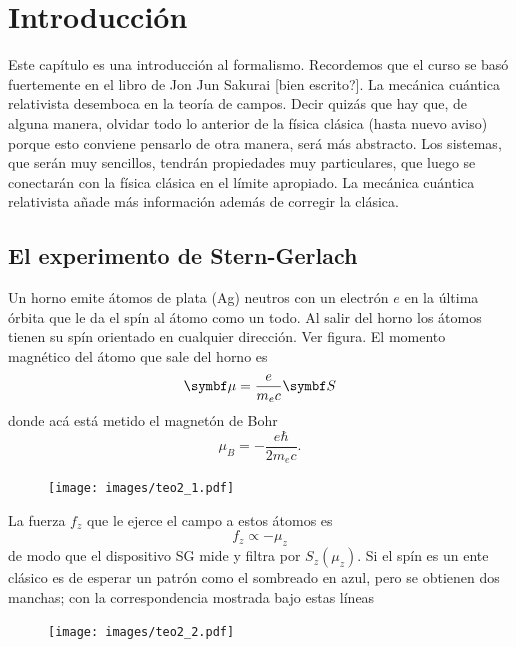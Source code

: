 \documentclass[10pt,oneside]{CBFT_book}
\begin{document}
\chapter{Introducción}

Este capítulo es una introducción al formalismo.
Recordemos que el curso se basó fuertemente en el libro de Jon Jun Sakurai [bien escrito?].
La mecánica cuántica relativista desemboca en la teoría de campos.
Decir quizás que hay que, de alguna manera, olvidar todo lo anterior de la física clásica (hasta
nuevo aviso) porque esto conviene pensarlo de otra manera, será más abstracto.
Los sistemas, que serán muy sencillos, tendrán propiedades muy particulares, que luego se
conectarán con la física clásica en el límite apropiado.
La mecánica cuántica relativista añade más información además de corregir la clásica.

\section{El experimento de Stern-Gerlach}

Un horno emite átomos de plata (Ag) neutros con un electrón $e$ en la última órbita que le da el spín
al átomo como un todo. Al salir del horno los átomos tienen su spín orientado en cualquier dirección.
Ver figura.
El momento magnético del átomo que sale del horno es 
\[
	\vb{\mu} = \frac{e}{m_e c} \vb{S}
\]
donde acá está metido el magnetón de Bohr 
\[
	\mu_B = -\frac{ e \hbar }{2 m_e c}.
\]

\begin{figure}[htb]
	\begin{center}
	\texttt{[image: images/teo2\_1.pdf]}	 
	\end{center}
	\caption{}
\end{figure} 

La fuerza $f_z$ que le ejerce el campo  a estos átomos es 
\[
	f_z \propto - \mu_z
\]
de modo que el dispositivo SG mide y filtra por $S_z(\mu_z)$. Si el spín es un ente clásico
es de esperar un patrón como el sombreado en azul, pero se obtienen dos manchas; 
con la correspondencia mostrada bajo estas líneas
\begin{figure}[htb]
	\begin{center}
	\texttt{[image: images/teo2\_2.pdf]}	 
	\end{center}
	\caption{}
\end{figure} 
\end{document}
